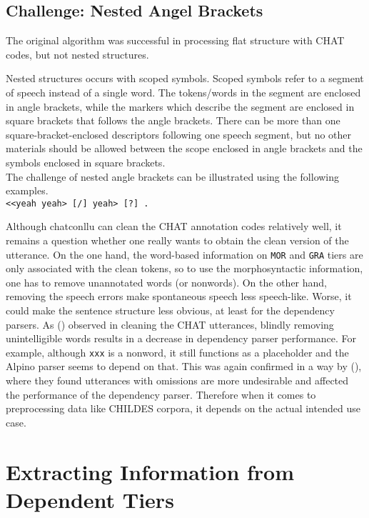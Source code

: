 \subsection{Challenge: Nested Angel Brackets}

The original algorithm was successful in processing flat structure with CHAT codes, but not nested structures.

Nested structures occurs with scoped symbols. Scoped symbols refer to a segment of speech instead of a single word. The tokens/words in the segment are enclosed in angle brackets, while the markers which describe the segment are enclosed in square brackets that follows the angle brackets. There can be more than one square-bracket-enclosed descriptors following one speech segment, but no other materials should be allowed between the scope enclosed in angle brackets and the symbols enclosed in square brackets.\\
The challenge of nested angle brackets can be illustrated using the following examples.\\

\texttt{<<yeah yeah> [/] yeah> [?] .}

Although chatconllu can clean the CHAT annotation codes relatively well, it remains a question whether one really wants to obtain the clean version of the utterance. On the one hand, the word-based information on \texttt{MOR} and \texttt{GRA} tiers are only associated with the clean tokens, so to use the morphosyntactic information, one has to remove unannotated words (or nonwords). On the other hand, removing the speech errors make spontaneous speech less speech-like. Worse, it could make the sentence structure less obvious, at least for the dependency parsers. As (\cite{odijk2018anncor}) observed in cleaning the CHAT utterances, blindly removing unintelligible words results in a decrease in dependency parser performance. For example, although \texttt{xxx} is a nonword, it still functions as a placeholder  and the Alpino parser seems to depend on that. This was again confirmed in a way by (\cite{liu2021}), where they found utterances with omissions are more undesirable and affected the performance of the dependency parser. Therefore when it comes to preprocessing data like CHILDES corpora, it depends on the actual intended use case.

\section{Extracting Information from Dependent Tiers}


